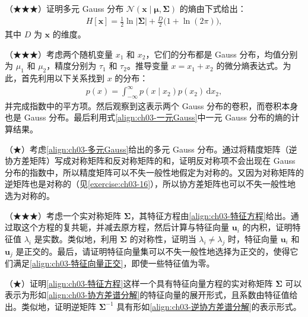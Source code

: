 \documentclass[../../main.tex]{subfiles}
\begin{document}
\begin{exercise}\label{exercise:ch03-09}
（★★★）证明多元 Gauss 分布 $\mathcal{N}(\boldsymbol{x}\mid\boldsymbol{\mu},\boldsymbol{\Sigma})$ 的熵由下式给出：
\begin{align*}
H[\boldsymbol{x}]=\frac{1}{2}\ln\lvert\boldsymbol{\Sigma}\rvert+\frac{D}{2}\bigl(1+\ln(2\pi)\bigr),
\end{align*}
其中 $D$ 为 $\boldsymbol{x}$ 的维度。
\end{exercise}

\begin{exercise}\label{exercise:ch03-10}
（★★★）考虑两个随机变量 $x_1$ 和 $x_2$，它们的分布都是 Gauss 分布，均值分别为 $\mu_1$ 和 $\mu_2$，精度分别为 $\tau_1$ 和 $\tau_2$。推导变量 $x=x_1+x_2$ 的微分熵表达式。为此，首先利用以下关系找到 $x$ 的分布：
\begin{align*}
p(x)=\int_{-\infty}^{\infty}p(x\mid x_2)p(x_2)\,\mathrm{d}x_2,
\end{align*}
并完成指数中的平方项。然后观察到这表示两个 Gauss 分布的卷积，而卷积本身也是 Gauss 分布。最后利用式\eqref{align:ch03-一元Gauss}中一元 Gauss 分布的熵的计算结果。
\end{exercise}

\begin{exercise}\label{exercise:ch03-11}
（★）考虑\eqref{align:ch03-多元Gauss}给出的多元 Gauss 分布。通过将精度矩阵（逆协方差矩阵）写成对称矩阵和反对称矩阵的和，证明反对称项不会出现在 Gauss 分布的指数中，所以精度矩阵可以不失一般性地假定为对称的。又因为对称矩阵的逆矩阵也是对称的（见\cref{exercise:ch03-16}），所以协方差矩阵也可以不失一般性地选为对称的。
\end{exercise}

\begin{exercise}\label{exercise:ch03-12}
（★★★）考虑一个实对称矩阵 $\boldsymbol{\Sigma}$，其特征方程由\eqref{align:ch03-特征方程}给出。通过取这个方程的复共轭，并减去原方程，然后计算与特征向量 $\boldsymbol{u}_i$ 的内积，证明特征值 $\lambda_i$ 是实数。类似地，利用 $\boldsymbol{\Sigma}$ 的对称性，证明当 $\lambda_i\neq\lambda_j$ 时，特征向量 $\boldsymbol{u}_i$ 和 $\boldsymbol{u}_j$ 是正交的。最后，请证明特征向量集可以不失一般性地选择为正交的，使得它们满足\eqref{align:ch03-特征向量正交}，即使一些特征值为零。
\end{exercise}

\begin{exercise}\label{exercise:ch03-13}
（★）证明\eqref{align:ch03-特征方程}这样一个具有特征向量方程的实对称矩阵 $\boldsymbol{\Sigma}$ 可以表示为形如\eqref{align:ch03-协方差谱分解}的特征向量的展开形式，且系数由特征值给出。类似地，证明逆矩阵 $\boldsymbol{\Sigma}^{-1}$ 具有形如\eqref{align:ch03-逆协方差谱分解}的表示形式。
\end{exercise}
\end{document}
